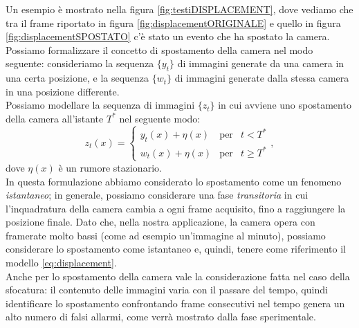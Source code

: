 \noindent Un esempio \`e mostrato nella figura \ref{fig:testiDISPLACEMENT}, dove vediamo che tra il frame riportato in figura \ref{fig:displacementORIGINALE} e quello in figura \ref{fig:displacementSPOSTATO} c'\`e stato un evento che ha spostato la camera.
Possiamo formalizzare il concetto di spostamento della camera nel modo seguente: consideriamo la sequenza $\{y_t\}$ di immagini generate da una camera in una certa posizione, e la sequenza $\{w_t\}$ di immagini generate dalla stessa camera in una posizione differente.\\
Possiamo modellare la sequenza di immagini $\{z_t\}$ in cui avviene uno spostamento della camera all'istante $T^*$ nel seguente modo:
\begin{equation}
\label{eq:displacement}
z_t(x)  = \left\{ \begin{array}{rcl}
	y_t(x) + \eta(x) & \mbox{per} & t < T^* \\
	w_t(x) + \eta(x) & \mbox{per} & t \geqslant T^*
	\end{array}\right. ,
\end{equation}
dove $\eta(x)$ \`e un rumore stazionario.\\
In questa formulazione abbiamo considerato lo spostamento come un fenomeno \textit{istantaneo};
in generale, possiamo considerare una fase \textit{transitoria} in cui l'inquadratura della camera cambia a ogni \gls{frame} acquisito, fino a raggiungere la posizione finale. 
Dato che, nella nostra applicazione, la camera opera con \gls{framerate} molto bassi (come ad esempio un'immagine al minuto), possiamo considerare lo spostamento come istantaneo e, quindi, tenere come riferimento il modello \eqref{eq:displacement}.\\
Anche per lo spostamento della camera vale la considerazione fatta nel caso della sfocatura: il contenuto delle immagini varia con il passare del tempo, quindi identificare lo spostamento confrontando frame consecutivi nel tempo genera un alto numero di falsi allarmi, come verr\`a mostrato dalla fase sperimentale.
